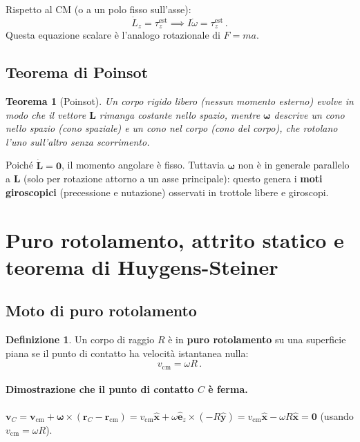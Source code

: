 \documentclass[11pt,a4paper]{article}
\renewcommand{\vec}[1]{\bm{#1}}
\newcommand{\ez}{\hat{\bm{e}}_z}
\newcommand{\om}{\vec{\omega}}
\newcommand{\CM}{\mathrm{cm}}
\theoremstyle{plain}
\newtheorem{teorema}{Teorema}[section]
\theoremstyle{definition}
\newtheorem{definizione}{Definizione}[section]
\theoremstyle{remark}
\begin{document}
Rispetto al CM (o a un polo fisso sull'asse):
\[
  \dot{L}_z=\tau_z^\mathrm{est} \implies I\dot\omega=\tau_z^\mathrm{est}\,.
\]
Questa equazione scalare è l'analogo rotazionale di $F=ma$.

\subsection{Teorema di Poinsot}

\begin{teorema}[Poinsot]
Un corpo rigido libero (nessun momento esterno) evolve in modo che il vettore
$\vec{L}$ rimanga costante nello spazio, mentre $\vec{\omega}$ descrive un
cono nello spazio (\emph{cono spaziale}) e un cono nel corpo (\emph{cono del
corpo}), che rotolano l'uno sull'altro senza scorrimento.
\end{teorema}

Poiché $\dot{\vec{L}}=\vec{0}$, il momento angolare è fisso. Tuttavia
$\vec{\omega}$ non è in generale parallelo a $\vec{L}$ (solo per rotazione
attorno a un asse principale): questo genera i \textbf{moti giroscopici}
(precessione e nutazione) osservati in trottole libere e giroscopi.

\section{Puro rotolamento, attrito statico e teorema di Huygens-Steiner}

\subsection{Moto di puro rotolamento}

\begin{definizione}
Un corpo di raggio $R$ è in \textbf{puro rotolamento} su una superficie piana
se il punto di contatto ha velocità istantanea nulla:
\[
  v_\CM=\omega R\,.
\]
\end{definizione}

\paragraph{Dimostrazione che il punto di contatto $C$ è ferma.}
$\vec{v}_C=\vec{v}_\CM+\om\times(\vec{r}_C-\vec{r}_\CM)=v_\CM\hat{\bm{x}}+\omega\ez\times(-R\hat{\bm{y}})=v_\CM\hat{\bm{x}}-\omega R\hat{\bm{x}}=\vec{0}$ (usando $v_\CM=\omega R$).
\end{document}
